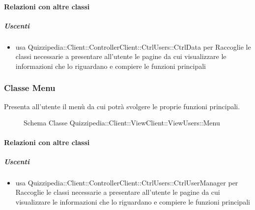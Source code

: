 \paragraph{Relazioni con altre classi}
\subparagraph{Uscenti}
\begin{itemize}
\item usa Quizzipedia::Client::ControllerClient::CtrlUsers::CtrlData per Raccoglie le classi necessarie a presentare all'utente le pagine da cui visualizzare le informazioni che lo riguardano e compiere le funzioni principali
\end{itemize}
\subsubsection{Classe Menu}
Presenta all'utente il menù da cui potrà svolgere le proprie funzioni principali.
\begin{figure}[H]
\centering
\noindent{}
\caption[Schema Classe Menu]{Schema Classe Quizzipedia::Client::ViewClient::ViewUsers::Menu}
\end{figure}
\paragraph{Relazioni con altre classi}
\subparagraph{Uscenti}
\begin{itemize}
\item usa Quizzipedia::Client::ControllerClient::CtrlUsers::CtrlUserManager per Raccoglie le classi necessarie a presentare all'utente le pagine da cui visualizzare le informazioni che lo riguardano e compiere le funzioni principali
\end{itemize}
